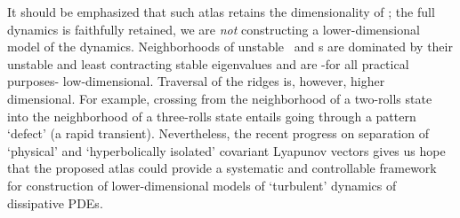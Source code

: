 It should be emphasized that such atlas retains the dimensionality of
\reducedsp; the full dynamics is faithfully retained, we are \emph{not}
constructing a lower-dimensional model of the dynamics. Neighborhoods of
unstable \eqva\ and \po s are dominated by their unstable and least
contracting stable eigenvalues and are -for all practical purposes-
low-dimensional. Traversal of the ridges is, however, higher dimensional.
For example, crossing from the neighborhood of a two-rolls state into the
neighborhood of a three-rolls state entails going through a pattern
`defect' (a rapid transient). Nevertheless, the recent progress on
separation of `physical' and `hyperbolically isolated' covariant Lyapunov
vectors gives us
hope that the proposed atlas could provide a systematic and controllable
framework for construction of lower-dimensional models of `turbulent'
dynamics of dissipative PDEs.

%
